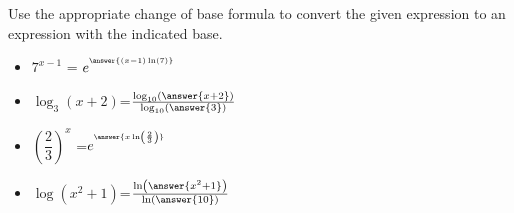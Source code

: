 \documentclass{ximera}
\author{Carl Stitz \and Jeff Zeager \and Bart Snapp \and Matthew Carr\and Nela Lakos}
\begin{document}
\begin{exercise}
Use the appropriate change of base formula to convert the given
expression to an expression with the indicated base.

\begin{itemize}
\item $7^{x - 1}$ = $e^{^{\answer{(x-1)\ln(7)}}}$
\item $\log_{3}(x + 2)$=$\frac{\log_{10}\left(\answer{x+2}\right)}{\log_{10}\left(\answer{3}\right)}$
\item $\left(\dfrac{2}{3}\right)^{x}$ =$e^{^{\answer{x\ln\left(\frac{2}{3}\right)}}}$
\item $\log(x^{2} + 1)$=$\frac{\ln\left(\answer{x^2+1}\right)}{\ln\left(\answer{10}\right)}$
\end{itemize}

\end{exercise}
\end{document}
